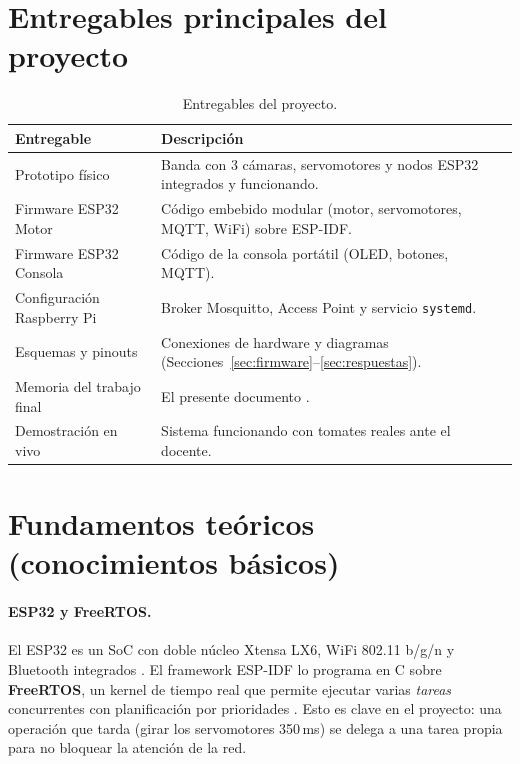 \documentclass[12pt]{catolica_proyectos}
\begin{document}
\section{Entregables principales del proyecto}

\begin{table}[H]
\centering
\caption{Entregables del proyecto.}
\label{tab:entregables}
\footnotesize
\begin{tabular}{@{}p{4.2cm}p{8cm}@{}}
\toprule
\textbf{Entregable} & \textbf{Descripción} \\
\midrule
Prototipo físico & Banda con 3 cámaras, servomotores y nodos ESP32 integrados y funcionando. \\
Firmware ESP32 Motor & Código embebido modular (motor, servomotores, MQTT, WiFi) sobre ESP-IDF. \\
Firmware ESP32 Consola & Código de la consola portátil (OLED, botones, MQTT). \\
Configuración Raspberry Pi & Broker Mosquitto, Access Point y servicio \texttt{systemd}. \\
Esquemas y pinouts & Conexiones de hardware y diagramas (Secciones~\ref{sec:firmware}--\ref{sec:respuestas}). \\
Memoria del trabajo final & El presente documento \cite{ucb2026}. \\
Demostración en vivo & Sistema funcionando con tomates reales ante el docente. \\
\bottomrule
\end{tabular}
\end{table}

\section{Fundamentos teóricos (conocimientos básicos)}

\paragraph{ESP32 y FreeRTOS.} El ESP32 es un SoC con doble núcleo Xtensa LX6, WiFi 802.11 b/g/n y Bluetooth integrados \cite{espressif2023trm}. El framework ESP-IDF lo programa en C sobre \textbf{FreeRTOS}, un kernel de tiempo real que permite ejecutar varias \emph{tareas} concurrentes con planificación por prioridades \cite{barry2016freertos}. Esto es clave en el proyecto: una operación que tarda (girar los servomotores 350\,ms) se delega a una tarea propia para no bloquear la atención de la red.
\end{document}
